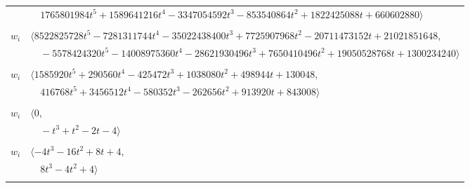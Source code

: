 \documentclass[11pt]{article}
\begin{document}
\begin{longtable}{@{}ll@{}}
 & $\quad 1765801984t^{5}+1589641216t^{4}-3347054592t^{3}-853540864t^{2}+1822425088t+660602880\rangle$\\
\addlinespace[2pt]
\multicolumn{2}{@{}p{0.97\textwidth}@{}}{$i=24$, $D_i=8388608$, $\rho_{ij}$: $4{:}1, \allowbreak 10{:}1, \allowbreak 19{:}1, \allowbreak 25{:}1, \allowbreak 29{:}1, \allowbreak 33{:}2, \allowbreak 34{:}2, \allowbreak 36{:}1, \allowbreak 42{:}2, \allowbreak 51{:}2, \allowbreak 53{:}1, \allowbreak 56{:}2, \allowbreak 58{:}2, \allowbreak 66{:}2, \allowbreak 69{:}1$}\\
$w_i$ & $\langle 8522825728t^{5}-7281311744t^{4}-35022438400t^{3}+7725907968t^{2}-20711473152t+21021851648,$\\
 & $\quad -5578424320t^{5}-14008975360t^{4}-28621930496t^{3}+7650410496t^{2}+19050528768t+1300234240\rangle$\\
\addlinespace[2pt]
\multicolumn{2}{@{}p{0.97\textwidth}@{}}{$i=25$, $D_i=256$, $\rho_{ij}$: $4{:}2, \allowbreak 6{:}1, \allowbreak 7{:}2, \allowbreak 9{:}2, \allowbreak 10{:}2, \allowbreak 15{:}1, \allowbreak 20{:}2, \allowbreak 24{:}2, \allowbreak 29{:}1, \allowbreak 31{:}1, \allowbreak 32{:}1, \allowbreak 42{:}2, \allowbreak 48{:}1, \allowbreak 58{:}2, \allowbreak 59{:}2, \allowbreak 64{:}1, \allowbreak 73{:}2$}\\
$w_i$ & $\langle 1585920t^{5}+290560t^{4}-425472t^{3}+1038080t^{2}+498944t+130048,$\\
 & $\quad 416768t^{5}+3456512t^{4}-580352t^{3}-262656t^{2}+913920t+843008\rangle$\\
\addlinespace[2pt]
\multicolumn{2}{@{}p{0.97\textwidth}@{}}{$i=26$, $D_i=2$, $\rho_{ij}$: $32{:}2, \allowbreak 42{:}1, \allowbreak 44{:}2, \allowbreak 52{:}1, \allowbreak 54{:}2, \allowbreak 57{:}2, \allowbreak 75{:}1$}\\
$w_i$ & $\langle 0,$\\
 & $\quad -t^{3}+t^{2}-2t-4\rangle$\\
\addlinespace[2pt]
\multicolumn{2}{@{}p{0.97\textwidth}@{}}{$i=27$, $D_i=4$, $\rho_{ij}$: $4{:}1, \allowbreak 36{:}2, \allowbreak 41{:}2, \allowbreak 43{:}2, \allowbreak 46{:}2, \allowbreak 66{:}1$}\\
$w_i$ & $\langle -4t^{3}-16t^{2}+8t+4,$\\
 & $\quad 8t^{3}-4t^{2}+4\rangle$\\
\addlinespace[2pt]
\multicolumn{2}{@{}p{0.97\textwidth}@{}}{$i=28$, $D_i=256$, $\rho_{ij}$: $4{:}2, \allowbreak 9{:}2, \allowbreak 12{:}2, \allowbreak 22{:}2, \allowbreak 35{:}1, \allowbreak 36{:}1, \allowbreak 39{:}1, \allowbreak 46{:}2, \allowbreak 54{:}2, \allowbreak 74{:}1$}\\

\end{longtable}
\end{document}
